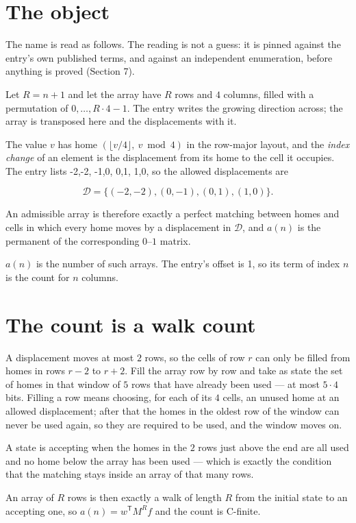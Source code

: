 \documentclass[11pt]{article}
\theoremstyle{definition}
\begin{document}
\section{The object}

The name is read as follows. The reading is not a guess: it is pinned against the entry's own published terms, and against an independent enumeration, before anything is proved (Section 7).

Let $R = n + 1$ and let the array have $R$ rows and $4$ columns, filled with a permutation of $0,\dots,R\cdot4-1$. The entry writes the growing direction across; the array is transposed here and the displacements with it.

The value $v$ has home $(\lfloor v/4\rfloor,\ v \bmod 4)$ in the row-major layout, and the {\itshape index change} of an element is the displacement from its home to the cell it occupies. The entry lists -2,-2, -1,0, 0,1, 1,0, so the allowed displacements are

\[\mathcal{D} = \{(-2,-2), (0,-1), (0,1), (1,0)\}.\]

An admissible array is therefore exactly a perfect matching between homes and cells in which every home moves by a displacement in $\mathcal{D}$, and $a(n)$ is the permanent of the corresponding $0$--$1$ matrix.

$a(n)$ is the number of such arrays. The entry's offset is 1, so its term of index $n$ is the count for $n$ columns.

\section{The count is a walk count}

A displacement moves at most $2$ rows, so the cells of row $r$ can only be filled from homes in rows $r-2$ to $r+2$. Fill the array row by row and take as state the set of homes in that window of $5$ rows that have already been used --- at most $5\cdot4$ bits. Filling a row means choosing, for each of its $4$ cells, an unused home at an allowed displacement; after that the homes in the oldest row of the window can never be used again, so they are required to be used, and the window moves on.

A state is accepting when the homes in the $2$ rows just above the end are all used and no home below the array has been used --- which is exactly the condition that the matching stays inside an array of that many rows.

An array of $R$ rows is then exactly a walk of length $R$ from the initial state to an accepting one, so $a(n) = w^{\mathsf T}M^{R}f$ and the count is C-finite.
\end{document}
